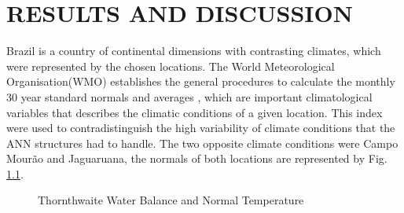 \chapter{RESULTS AND DISCUSSION }
\label{chapter:servidores_linux}
\vspace{-2cm}


Brazil is a country of continental dimensions with contrasting climates, which were represented by the chosen locations. The World Meteorological Organisation(WMO) establishes the general procedures to calculate the monthly 30 year standard normals and averages \cite{wmo1989calculation}, which are important climatological variables that describes the climatic conditions of a given location. This index were used to contradistinguish the high variability of climate conditions that the ANN structures had to handle. The two opposite climate conditions were Campo Mourão and Jaguaruana, the normals of both locations are represented by Fig. \ref{img:figure4}.


\begin{figure}[htbp]
\caption{Thornthwaite Water Balance and Normal Temperature}
\label{img:figure4}
\end{figure}


